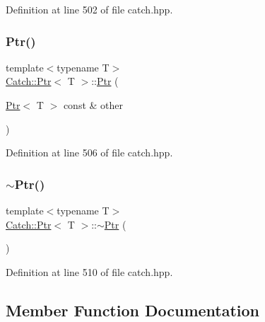 Definition at line 502 of file catch.\+hpp.

\hypertarget{class_catch_1_1_ptr_ac629dd8ebe5763a37bb89e6c1d6a1771}{}\label{class_catch_1_1_ptr_ac629dd8ebe5763a37bb89e6c1d6a1771} 
\subsubsection{\texorpdfstring{Ptr()}{Ptr()}\hspace{0.1cm}{\footnotesize\ttfamily [3/3]}}
{\footnotesize\ttfamily template$<$typename T$>$ \\
\hyperlink{class_catch_1_1_ptr}{Catch\+::\+Ptr}$<$ T $>$\+::\hyperlink{class_catch_1_1_ptr}{Ptr} (\begin{DoxyParamCaption}\item[{\hyperlink{class_catch_1_1_ptr}{Ptr}$<$ T $>$ const \&}]{other }\end{DoxyParamCaption})\hspace{0.3cm}{\ttfamily [inline]}}



Definition at line 506 of file catch.\+hpp.

\hypertarget{class_catch_1_1_ptr_ac96d3bb33adcfb983207385cfba5fe8a}{}\label{class_catch_1_1_ptr_ac96d3bb33adcfb983207385cfba5fe8a} 
\subsubsection{\texorpdfstring{$\sim$\+Ptr()}{~Ptr()}}
{\footnotesize\ttfamily template$<$typename T$>$ \\
\hyperlink{class_catch_1_1_ptr}{Catch\+::\+Ptr}$<$ T $>$\+::$\sim$\hyperlink{class_catch_1_1_ptr}{Ptr} (\begin{DoxyParamCaption}{ }\end{DoxyParamCaption})\hspace{0.3cm}{\ttfamily [inline]}}



Definition at line 510 of file catch.\+hpp.



\subsection{Member Function Documentation}
\hypertarget{class_catch_1_1_ptr_a2158bb2a1a21b001a2e72d4591d3e31e}{}\label{class_catch_1_1_ptr_a2158bb2a1a21b001a2e72d4591d3e31e} 
